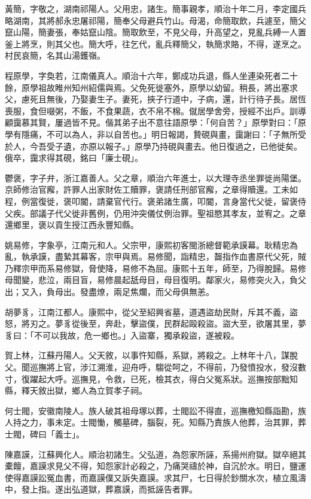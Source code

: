 \begin{pinyinscope}
黃簡，字敬之，湖南祁陽人。父用忠，諸生。簡事親孝，順治十年二月，李定國兵略湖南，其將郝永忠屠祁陽，簡奉父母避兵竹山。母渴，命簡取飲，兵遽至，簡父竄山陽，簡妻張，奉姑竄山陰。簡取飲至，不見父母，升高望之，見亂兵縛一人置釜上將烹，則其父也。簡大呼，往乞代，亂兵釋簡父，執簡求賂，不得，遂烹之。村民哀簡，名其山湯鑊嶺。

程原學，字奐若，江南儀真人。順治十六年，鄭成功兵退，縣人坐連染死者二十餘，原學祖故睢州知州紹儒與焉。父免死徙塞外，原學以幼留。稍長，將出塞求父，慮死且無後，乃娶妻生子。妻死，挾子行道中，子病，還，計行待子長。居恆喪服，食但啜粥，不飯，不食果蔬，衣不帛不棉。僦居學舍旁，授經不出戶。訓導顧靄慕其賢，屢過皆不見。偕其弟子出不意往語原學：「何自苦？」原學對曰：「原學有隱痛，不可以為人，非以自苦也。」明日報謁，贄硯與畫，靄謝曰：「子無所受於人，今吾受子遺，亦原以報子。」原學乃持硯與畫去。他日復過之，已他徙矣。俄卒，靄求得其硯，銘曰「廉士硯」。

鬱褒，字子弁，浙江嘉善人。父之章，順治六年進士，以大理寺丞坐罪徙尚陽堡。京師修治官廨，許罪人出家財佐工贖罪，褒請任刑部官廨，之章得贖還。工未如程，例當復徙，褒叩閽，請棄官代行。褒弟諸生廣，叩閽，言身當代父徙，留褒侍父疾。部議子代父徙非舊例，仍用沖突儀仗例治罪。聖祖愍其孝友，並宥之。之章還鄉里，褒以貢生授江西永豐知縣。

姚易修，字象亭，江南元和人。父宗甲，康熙初客閩浙總督範承謨幕。耿精忠為亂，執承謨，盡縶其幕客，宗甲與焉。易修聞，詣精忠，齧指作血書原代父死，賊乃釋宗甲而系易修獄，脅使降，易修不為屈。康熙十五年，師至，乃得脫歸。易修母聞變，悲泣，兩目盲，易修晨起舐母目，母目復明。鄰家火，易修突火入，負父出；又入，負母出。發盡燎，兩足焦爛，而父母俱無恙。

胡夢豸，江南江都人。康熙中，從父至紹興省墓，道遇盜劫民財，斥其不義，盜怒，將刃之。夢豸從後至，奔赴，擊盜僕，民群起毆殺盜。盜大至，欲屠其里，夢豸曰：「不可以我故，危一鄉也。」入盜寨，獨承殺盜，遂被殺。

賀上林，江蘇丹陽人。父天敘，以事忤知縣，系獄，將殺之。上林年十八，謀脫父。聞巡撫將上官，涉江溯淮，迎舟呼，騶從呵之，不得前，乃發憤投水，發沒數寸，復躍起大呼。巡撫見，令救，已死，檢其衣，得白父冤系狀。巡撫按部黜知縣，釋天敘出獄，鄉人為立賀孝子祠。

何士閥，安徽南陵人。族人破其祖母塚以葬，士閥訟不得直，巡撫檄知縣詣勘，族人持之力，事未定。士閥慟，觸墓碑，腦裂，死。知縣乃責族人他葬，治其罪，葬士閥，碑曰「義士」。

陳嘉謨，江蘇興化人。順治初諸生。父弘道，為怨家所誣，系揚州府獄。獄卒絕其橐饘，嘉謨求見父不得，知怨家計必殺之，乃痛哭禱於神，自沉於水。明日，鹽運使得嘉謨訟冤血書，而嘉謨僕又訴失嘉謨。求其尸，七日得於鈔關水次，植立風濤中，發上指。遂出弘道獄，葬嘉謨，而抵誣告者罪。


\end{pinyinscope}
